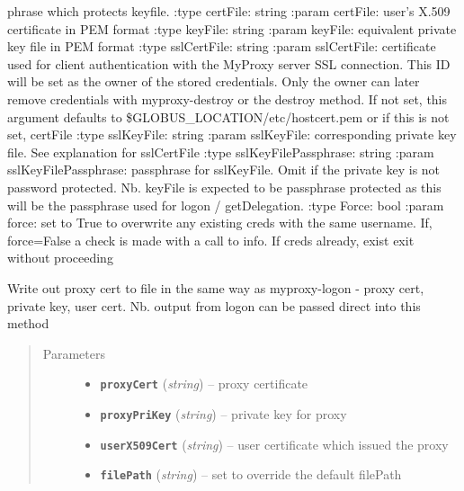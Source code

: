 \documentclass[letterpaper,10pt,english]{sphinxmanual}
\begin{document}
\begin{fulllineitems}
\begin{fulllineitems}
phrase which protects keyfile.
:type certFile: string
:param certFile: user's X.509 certificate in PEM format
:type keyFile: string
:param keyFile: equivalent private key file in PEM format
:type sslCertFile: string
:param sslCertFile: certificate used for client authentication with
the MyProxy server SSL connection.  This ID will be set as the owner
of the stored credentials.  Only the owner can later remove 
credentials with myproxy-destroy or the destroy method.  If not set,
this argument defaults to \$GLOBUS\_LOCATION/etc/hostcert.pem or if this
is not set, certFile
:type sslKeyFile: string
:param sslKeyFile: corresponding private key file.  See explanation
for sslCertFile
:type sslKeyFilePassphrase: string 
:param sslKeyFilePassphrase: passphrase for sslKeyFile.  Omit if the
private key is not password protected.  Nb. keyFile is expected to
be passphrase protected as this will be the passphrase used for
logon / getDelegation.
:type Force: bool
:param force: set to True to overwrite any existing creds with the
same username.  If, force=False a check is made with a call to info.
If creds already, exist exit without proceeding

\end{fulllineitems}


\begin{fulllineitems}
\label{client:myproxy.client.MyProxyClient.writeProxyFile}
Write out proxy cert to file in the same way as myproxy-logon - 
proxy cert, private key, user cert.  Nb. output from logon can be
passed direct into this method
\begin{quote}\begin{description}
\item[{Parameters}] \leavevmode\begin{itemize}
\item {} 
\textbf{\texttt{proxyCert}} (\emph{string}) -- proxy certificate

\item {} 
\textbf{\texttt{proxyPriKey}} (\emph{string}) -- private key for proxy

\item {} 
\textbf{\texttt{userX509Cert}} (\emph{string}) -- user certificate which issued the proxy

\item {} 
\textbf{\texttt{filePath}} (\emph{string}) -- set to override the default filePath

\end{itemize}

\end{description}\end{quote}

\end{fulllineitems}


\end{fulllineitems}
\end{document}
